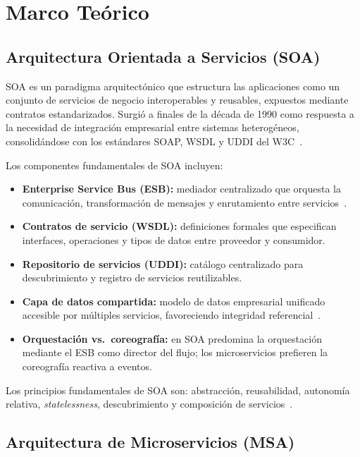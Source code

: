 \documentclass[conference,a4paper]{IEEEtran}
\begin{document}
\section{Marco Te\'orico}
\label{sec:marco}

\subsection{Arquitectura Orientada a Servicios (SOA)}

SOA es un paradigma arquitect\'onico que estructura las aplicaciones
como un conjunto de servicios de negocio interoperables y reusables,
expuestos mediante contratos estandarizados. Surgi\'o a finales de la
d\'ecada de 1990 como respuesta a la necesidad de integraci\'on
empresarial entre sistemas heterog\'eneos, consolid\'andose con los
est\'andares SOAP, WSDL y UDDI del W3C~\cite{papazoglou2023}.

Los componentes fundamentales de SOA incluyen:

\begin{itemize}[leftmargin=*]
  \item \textbf{Enterprise Service Bus (ESB):} mediador centralizado
    que orquesta la comunicaci\'on, transformaci\'on de mensajes y
    enrutamiento entre servicios~\cite{papazoglou2023}.
  \item \textbf{Contratos de servicio (WSDL):} definiciones formales
    que especifican interfaces, operaciones y tipos de datos entre
    proveedor y consumidor.
  \item \textbf{Repositorio de servicios (UDDI):} cat\'alogo
    centralizado para descubrimiento y registro de servicios
    reutilizables.
  \item \textbf{Capa de datos compartida:} modelo de datos
    empresarial unificado accesible por m\'ultiples servicios,
    favoreciendo integridad referencial~\cite{newman2021}.
  \item \textbf{Orquestaci\'on vs.\ coreograf\'ia:} en SOA predomina
    la orquestaci\'on mediante el ESB como director del flujo;
    los microservicios prefieren la coreograf\'ia reactiva a eventos.
\end{itemize}

Los principios fundamentales de SOA son: abstracci\'on, reusabilidad,
autonom\'ia relativa, \textit{statelessness}, descubrimiento y
composici\'on de servicios~\cite{aksakalli2021}.

\subsection{Arquitectura de Microservicios (MSA)}
\end{document}
